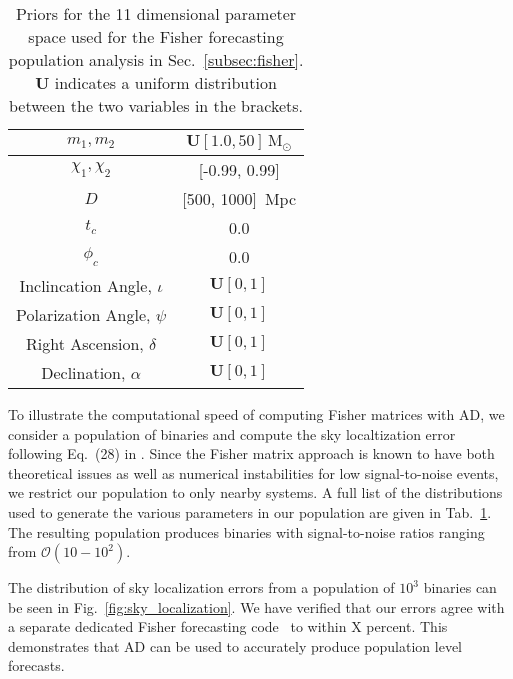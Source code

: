 \documentclass[twocolumn]{aastex631}
\begin{document}
\begin{table}[t]
    \centering
    \begin{tabular}{c|c}
    \hline\hline
    $m_1, m_2$ & $\boldsymbol{U}[1.0, 50]\, \mathrm{M}_\odot$ \\ \hline
    $\chi_1, \chi_2$ & [-0.99, 0.99] \\ \hline
    $D$ & [500, 1000]\, Mpc \\ \hline
    $t_c$ & 0.0 \\ \hline
    $\phi_c$ & 0.0 \\ \hline
    Inclincation Angle, $\iota$ & $\boldsymbol{U}[0, 1]$ \\ \hline
    Polarization Angle, $\psi$ & $\boldsymbol{U}[0, 1]$ \\ \hline
    Right Ascension, $\delta$ & $\boldsymbol{U}[0, 1]$ \\ \hline
    Declination, $\alpha$ & $\boldsymbol{U}[0, 1]$ \\ 
    \hline\hline
    \end{tabular}
    \caption{Priors for the 11 dimensional parameter space used for the Fisher forecasting population analysis in Sec.~\ref{subsec:fisher}. 
    $\boldsymbol{U}$ indicates a uniform distribution between the two variables in the brackets.}
    \label{tab:priors}
\end{table}

To illustrate the computational speed of computing Fisher matrices with AD, we consider a population of binaries and compute the sky localtization error following Eq.~(28) in \citep{Iacovelli:2022bbs, Iacovelli:2022mbg}.
Since the Fisher matrix approach is known to have both theoretical issues as well as numerical instabilities for low signal-to-noise events, we restrict our population to only nearby systems.
A full list of the distributions used to generate the various parameters in our population are given in Tab.~\ref{tab:priors}.
The resulting population produces binaries with signal-to-noise ratios ranging from $\mathcal{O}(10-10^2)$.

The distribution of sky localization errors from a population of $10^3$ binaries can be seen in Fig.~\ref{fig:sky_localization}.
We have verified that our errors agree with a separate dedicated Fisher forecasting code~\citep{Borhanian:2020ypi} to within X percent.
This demonstrates that AD can be used to accurately produce population level forecasts.
\end{document}
